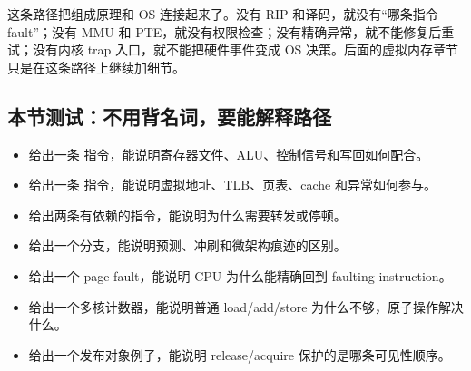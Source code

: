 这条路径把组成原理和 OS 连接起来了。没有 RIP 和译码，就没有“哪条指令 fault”；没有 MMU 和 PTE，就没有权限检查；没有精确异常，就不能修复后重试；没有内核 trap 入口，就不能把硬件事件变成 OS 决策。后面的虚拟内存章节只是在这条路径上继续加细节。

\subsection{本节测试：不用背名词，要能解释路径}

\begin{rubricbox}
\begin{itemize}
\tightlist
\item 给出一条  指令，能说明寄存器文件、ALU、控制信号和写回如何配合。
\item 给出一条  指令，能说明虚拟地址、TLB、页表、cache 和异常如何参与。
\item 给出两条有依赖的指令，能说明为什么需要转发或停顿。
\item 给出一个分支，能说明预测、冲刷和微架构痕迹的区别。
\item 给出一个 page fault，能说明 CPU 为什么能精确回到 faulting instruction。
\item 给出一个多核计数器，能说明普通 load/add/store 为什么不够，原子操作解决什么。
\item 给出一个发布对象例子，能说明 release/acquire 保护的是哪条可见性顺序。
\end{itemize}
\end{rubricbox}
